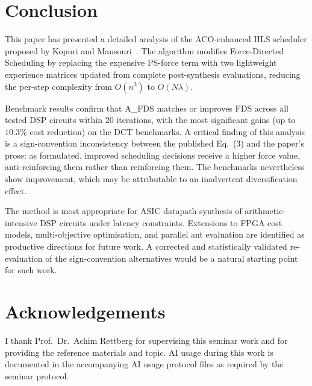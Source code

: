 \documentclass[conference]{IEEEtran}
\begin{document}
\section{Conclusion}

This paper has presented a detailed analysis of the ACO-enhanced HLS
scheduler proposed by Kopuri and Mansouri~\cite{kopuri2004aco}. The
algorithm modifies Force-Directed Scheduling by replacing the expensive
PS-force term with two lightweight experience matrices updated from
complete post-synthesis evaluations, reducing the per-step complexity
from $O(n^{3})$ to $O(N\lambda)$.

Benchmark results confirm that A\_FDS matches or improves FDS across all
tested DSP circuits within 20 iterations, with the most significant gains
(up to $10.3\%$ cost reduction) on the DCT benchmarks. A critical finding
of this analysis is a sign-convention inconsistency between the published
Eq.~(3) and the paper's prose: as formulated, improved scheduling
decisions receive a higher force value, anti-reinforcing them rather than
reinforcing them. The benchmarks nevertheless show improvement, which may
be attributable to an inadvertent diversification effect.

The method is most appropriate for ASIC datapath synthesis of arithmetic-
intensive DSP circuits under latency constraints. Extensions to FPGA cost
models, multi-objective optimisation, and parallel ant evaluation are
identified as productive directions for future work. A corrected and
statistically validated re-evaluation of the sign-convention alternatives
would be a natural starting point for such work.

\section*{Acknowledgements}
I thank Prof.\ Dr.\ Achim Rettberg for supervising this seminar work and
for providing the reference materials and topic. AI usage during this work
is documented in the accompanying AI usage protocol files as required by
the seminar protocol.
\end{document}
